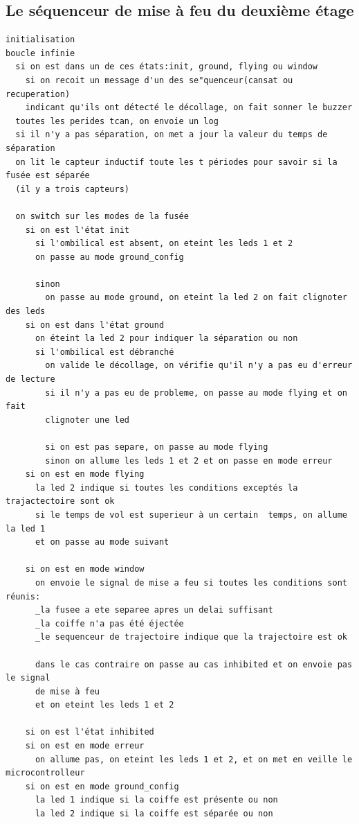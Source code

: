 \documentclass{article}
\begin{document}
\subsection*{Le séquenceur de mise à feu du deuxième étage}
\begin{verbatim}
initialisation
boucle infinie
  si on est dans un de ces états:init, ground, flying ou window
    si on recoit un message d'un des se"quenceur(cansat ou recuperation) 
    indicant qu'ils ont détecté le décollage, on fait sonner le buzzer
  toutes les perides tcan, on envoie un log
  si il n'y a pas séparation, on met a jour la valeur du temps de séparation
  on lit le capteur inductif toute les t périodes pour savoir si la fusée est séparée
  (il y a trois capteurs)
  
  on switch sur les modes de la fusée
    si on est l'état init
      si l'ombilical est absent, on eteint les leds 1 et 2
      on passe au mode ground_config
    
      sinon
        on passe au mode ground, on eteint la led 2 on fait clignoter des leds
    si on est dans l'état ground
      on éteint la led 2 pour indiquer la séparation ou non
      si l'ombilical est débranché
        on valide le décollage, on vérifie qu'il n'y a pas eu d'erreur de lecture
        si il n'y a pas eu de probleme, on passe au mode flying et on fait 
        clignoter une led
      
        si on est pas separe, on passe au mode flying
        sinon on allume les leds 1 et 2 et on passe en mode erreur
    si on est en mode flying
      la led 2 indique si toutes les conditions exceptés la trajactectoire sont ok
      si le temps de vol est superieur à un certain  temps, on allume la led 1 
      et on passe au mode suivant
    
    si on est en mode window
      on envoie le signal de mise a feu si toutes les conditions sont réunis:
      _la fusee a ete separee apres un delai suffisant
      _la coiffe n'a pas été éjectée
      _le sequenceur de trajectoire indique que la trajectoire est ok
      
      dans le cas contraire on passe au cas inhibited et on envoie pas le signal 
      de mise à feu
      et on eteint les leds 1 et 2
      
    si on est l'état inhibited
    si on est en mode erreur
      on allume pas, on eteint les leds 1 et 2, et on met en veille le microcontrolleur
    si on est en mode ground_config
      la led 1 indique si la coiffe est présente ou non
      la led 2 indique si la coiffe est séparée ou non
      

\end{verbatim}
\end{document}
